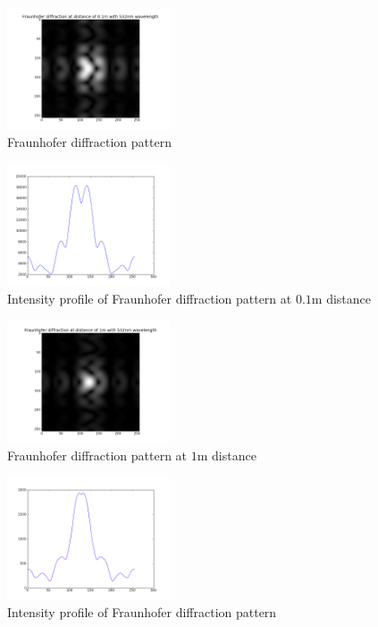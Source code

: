 \documentclass[journal,9pt]{IEEEtran}
\begin{document}
\begin{figure}[H]
\centering
\includegraphics[width=1.9in]{q1d100mm}
\caption{Fraunhofer diffraction pattern}
\label{fig:q1d100mm}
\end{figure}

\begin{figure}[H]
\centering
\includegraphics[width=1.9in]{q1i100mm}
\caption{Intensity profile of Fraunhofer diffraction pattern at $0.1$m distance}
\label{fig:q1i100mm}
\end{figure}

\begin{figure}[H]
\centering
\includegraphics[width=1.9in]{q1d1m}
\caption{Fraunhofer diffraction pattern at $1$m distance}
\label{fig:q1d1m}
\end{figure}

\begin{figure}[H]
\centering
\includegraphics[width=1.9in]{q1i1m}
\caption{Intensity profile of Fraunhofer diffraction pattern}
\label{fig:q1i1m}
\end{figure}
\end{document}
